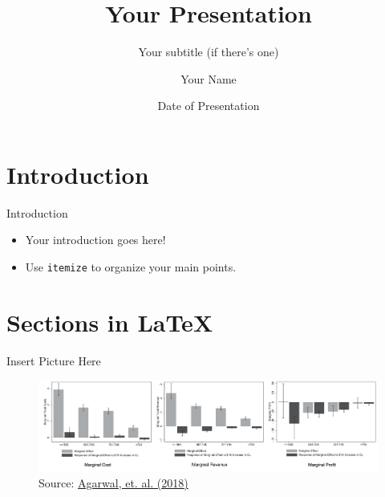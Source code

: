 \documentclass[10pt,xcolor={table,dvipsnames},t,aspectratio=169]{beamer}
\title[Your Short Title]{Your Presentation}
\subtitle{Your subtitle (if there's one)}
\author{Your Name}
\institute{Your Faculty/Department}
\date{Date of Presentation}
\begin{document}
{
\begin{frame}[noframenumbering]
    \titlepage
\end{frame}
}



\section{Introduction}

\begin{frame}{Introduction}
\begin{itemize}
  \item Your introduction goes here!
  \item Use \texttt{itemize} to organize your main points.
\end{itemize}
\end{frame}


\section{Sections in \LaTeX}

\begin{frame}[c]{Insert Picture Here}
    \begin{figure}[H]
    \centering
    \includegraphics[width=1\textwidth]{fig/marginal_profit.png}
    \caption{Source: \href{https://academic.oup.com/qje/article/133/1/129/3950284}{Agarwal, et. al. (2018)}}
    \end{figure}
\end{frame}
\end{document}
